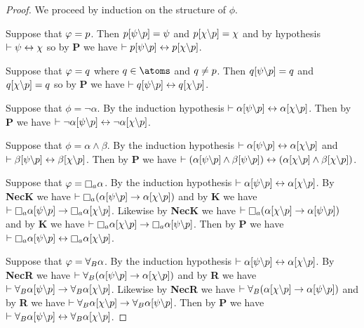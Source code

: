 \begin{proof}
We proceed by induction on the structure of $\phi$.

Suppose that $\varphi = p$.
Then $p[\psi\backslash p] = \psi$ and $p[\chi\backslash p] = \chi$ and by hypothesis $\vdash \psi \leftrightarrow \chi$ so by {\bf P} we have $\vdash p[\psi\backslash p] \leftrightarrow p[\chi\backslash p]$.

Suppose that $\varphi = q$ where $\atomQ \in \atoms$ and $q \neq p$.
Then $q[\psi\backslash p] = q$ and $q[\chi\backslash p] = q$ so by {\bf P} we have $\vdash q[\psi\backslash p] \leftrightarrow q[\chi\backslash p]$.

Suppose that $\phi = \lnot \alpha$.
By the induction hypothesis $\vdash \alpha[\psi\backslash p] \leftrightarrow \alpha[\chi\backslash p]$.
Then by {\bf P} we have $\vdash \lnot \alpha[\psi\backslash p] \leftrightarrow \lnot \alpha[\chi\backslash p]$.

Suppose that $\phi = \alpha \land \beta$.
By the induction hypothesis $\vdash \alpha[\psi\backslash p] \leftrightarrow \alpha[\chi\backslash p]$ and $\vdash \beta[\psi\backslash p] \leftrightarrow \beta[\chi\backslash p]$.
Then by {\bf P} we have $\vdash (\alpha[\psi\backslash p] \land \beta[\psi\backslash p]) \leftrightarrow (\alpha[\chi\backslash p] \land \beta[\chi\backslash p])$.

Suppose that $\phi = \necessaryA \alpha$.
By the induction hypothesis $\vdash \alpha[\psi\backslash p] \leftrightarrow \alpha[\chi\backslash p]$.
By {\bf NecK} we have $\proves \necessaryA (\alpha[\psi\backslash\atomP] \implies \alpha[\chi\backslash\atomP])$ and by {\bf K} we have $\proves \necessaryA \alpha[\psi\backslash\atomP] \implies \necessaryA \alpha[\chi\backslash\atomP]$.
Likewise by {\bf NecK} we have $\proves \necessaryA (\alpha[\chi\backslash\atomP] \implies \alpha[\psi\backslash\atomP])$ and by {\bf K} we have $\proves \necessaryA \alpha[\chi\backslash\atomP] \implies \necessaryA \alpha[\psi\backslash\atomP]$.
Then by {\bf P} we have $\proves \necessaryA \alpha[\psi\backslash\atomP] \iff \necessaryA \alpha[\chi\backslash\atomP]$.

Suppose that $\varphi = {\forall_{B}} \alpha$.
By the induction hypothesis $\vdash \alpha[\psi\backslash p] \leftrightarrow \alpha[\chi\backslash p]$.
By {\bf NecR} we have $\vdash {\forall_{B}} (\alpha[\psi\backslash p] \rightarrow \alpha[\chi\backslash p])$ and by {\bf R} we have $\vdash {\forall_{B}} \alpha[\psi\backslash p] \rightarrow {\forall_{B}} \alpha[\chi\backslash p]$.
Likewise by {\bf NecR} we have $\vdash {\forall_{B}} (\alpha[\chi\backslash p] \rightarrow \alpha[\psi\backslash p])$ and by {\bf R} we have $\vdash {\forall_{B}} \alpha[\chi\backslash p] \rightarrow {\forall_{B}} \alpha[\psi\backslash p]$.
Then by {\bf P} we have $\vdash {\forall_{B}} \alpha[\psi\backslash p] \leftrightarrow {\forall_{B}} \alpha[\chi\backslash p]$.
\end{proof}

